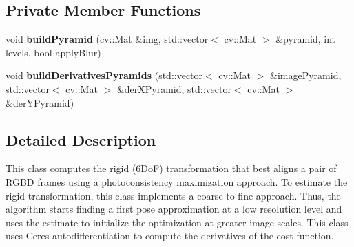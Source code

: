 \subsection*{Private Member Functions}
\begin{DoxyCompactItemize}
\item 
\hypertarget{class_photoconsistency_odometry_1_1_ceres_1_1_c_photoconsistency_odometry_ceres_a33c8529241349e266167b377c9652f8a}{
void {\bfseries buildPyramid} (cv::Mat \&img, std::vector$<$ cv::Mat $>$ \&pyramid, int levels, bool applyBlur)}
\label{class_photoconsistency_odometry_1_1_ceres_1_1_c_photoconsistency_odometry_ceres_a33c8529241349e266167b377c9652f8a}

\item 
\hypertarget{class_photoconsistency_odometry_1_1_ceres_1_1_c_photoconsistency_odometry_ceres_a57953e7b19bd6f264384a8c36daf7ffb}{
void {\bfseries buildDerivativesPyramids} (std::vector$<$ cv::Mat $>$ \&imagePyramid, std::vector$<$ cv::Mat $>$ \&derXPyramid, std::vector$<$ cv::Mat $>$ \&derYPyramid)}
\label{class_photoconsistency_odometry_1_1_ceres_1_1_c_photoconsistency_odometry_ceres_a57953e7b19bd6f264384a8c36daf7ffb}

\end{DoxyCompactItemize}


\subsection{Detailed Description}
This class computes the rigid (6DoF) transformation that best aligns a pair of RGBD frames using a photoconsistency maximization approach. To estimate the rigid transformation, this class implements a coarse to fine approach. Thus, the algorithm starts finding a first pose approximation at a low resolution level and uses the estimate to initialize the optimization at greater image scales. This class uses Ceres autodifferentiation to compute the derivatives of the cost function. 

